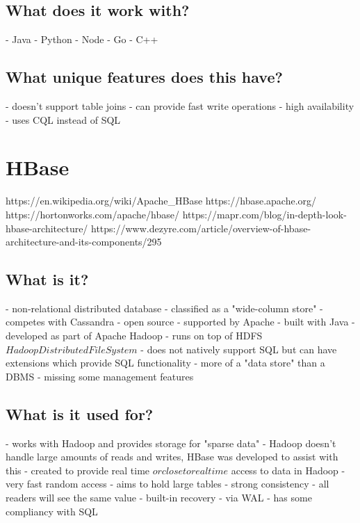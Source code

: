 \section{What does it work with?}
- Java
- Python
- Node
- Go
- C++

\section{What unique features does this have?}
- doesn't support table joins
- can provide fast write operations
- high availability
- uses CQL instead of SQL

\chapter{HBase}
https://en.wikipedia.org/wiki/Apache_HBase
https://hbase.apache.org/
https://hortonworks.com/apache/hbase/
https://mapr.com/blog/in-depth-look-hbase-architecture/
https://www.dezyre.com/article/overview-of-hbase-architecture-and-its-components/295

\section{What is it?}
- non-relational distributed database - classified as a "wide-column store" - competes with Cassandra
- open source
- supported by Apache
- built with Java
- developed as part of Apache Hadoop - runs on top of HDFS \(Hadoop Distributed File System\)
- does not natively support SQL but can have extensions which provide SQL functionality
- more of a "data store" than a DBMS - missing some management features

\section{What is it used for?}
- works with Hadoop and provides storage for "sparse data"
- Hadoop doesn't handle large amounts of reads and writes, HBase was developed to assist with this
- created to provide real time \(or close to real time\) access to data in Hadoop - very fast random access
- aims to hold large tables
- strong consistency - all readers will see the same value
- built-in recovery - via WAL
- has some compliancy with SQL

